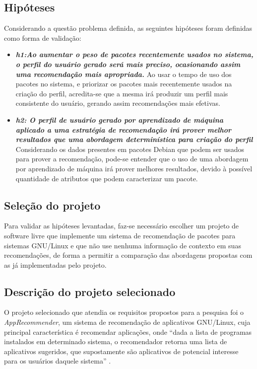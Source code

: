 \subsection{Hipóteses} \label{sec:hipoteses}

Considerando a questão problema definida, as seguintes hipóteses foram definidas
como forma de validação:

\begin{itemize} \item \textit{\textbf{h1:Ao aumentar o peso de pacotes
recentemente usados no sistema, o perfil do usuário gerado será mais preciso,
ocasionando assim uma recomendação mais apropriada.}} Ao usar o tempo de uso dos
pacotes no sistema, e priorizar os pacotes mais recentemente usados na criação
do perfil, acredita-se que a mesma irá produzir um perfil mais
consistente do usuário, gerando assim recomendações mais efetivas.\item
\textit{\textbf{h2: O perfil de usuário gerado por aprendizado de máquina aplicado a uma
estratégia de recomendação irá prover melhor resultados que uma abordagem
determinística para criação do perfil}}
Considerando os dados presentes em pacotes Debian que podem ser
usados para prover a recomendação, pode-se entender que o uso de uma abordagem
por aprendizado de máquina irá prover melhores resultados, devido à possível
quantidade de atributos que podem caracterizar um pacote.
\end{itemize}

\subsection{Seleção do projeto}

Para validar as hipóteses levantadas, faz-se necessário escolher um projeto de
software livre que implemente um sistema de recomendação de pacotes
para sistemas GNU/Linux e que não use nenhuma informação de contexto em suas
recomendações, de forma a permitir a comparação das abordagens propostas com as
já implementadas pelo projeto.

\subsection{Descrição do projeto selecionado}

O projeto selecionado que atendia os requisitos propostos para a pesquisa foi o
\textit{AppRecommender}, um sistema de recomendação de aplicativos GNU/Linux,
cuja principal característica é recomendar aplicações,
onde “dada a lista de programas instalados em determinado sistema, o recomendador retorna uma lista de aplicativos
sugeridos, que supostamente são aplicativos de potencial interesse para os usuários daquele sistema”
\cite{araujo2011apprecommender}.

